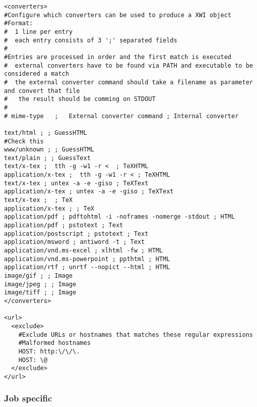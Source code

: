 \begin{verbatim}
<converters>
#Configure which converters can be used to produce a XWI object
#Format:
#  1 line per entry
#  each entry consists of 3 ';' separated fields
#
#Entries are processed in order and the first match is executed
#  external converters have to be found via PATH and executable to be considered a match
#  the external converter command should take a filename as parameter and convert that file
#   the result should be comming on STDOUT
#
# mime-type   ;   External converter command ; Internal converter

text/html ; ; GuessHTML
#Check this
www/unknown ; ; GuessHTML
text/plain ; ; GuessText
text/x-tex ;  tth -g -w1 -r <  ; TeXHTML
application/x-tex ;  tth -g -w1 -r < ; TeXHTML
text/x-tex ; untex -a -e -giso ; TeXText
application/x-tex ; untex -a -e -giso ; TeXText
text/x-tex ;  ; TeX
application/x-tex ; ; TeX
application/pdf ; pdftohtml -i -noframes -nomerge -stdout ; HTML
application/pdf ; pstotext ; Text
application/postscript ; pstotext ; Text
application/msword ; antiword -t ; Text
application/vnd.ms-excel ; xlhtml -fw ; HTML
application/vnd.ms-powerpoint ; ppthtml ; HTML
application/rtf ; unrtf --nopict --html ; HTML
image/gif ; ; Image
image/jpeg ; ; Image
image/tiff ; ; Image
</converters>

<url>
  <exclude>
    #Exclude URLs or hostnames that matches these regular expressions
    #Malformed hostnames
    HOST: http:\/\/\.
    HOST: \@
  </exclude>
</url>
\end{verbatim}
\subsubsection{Job specific}

